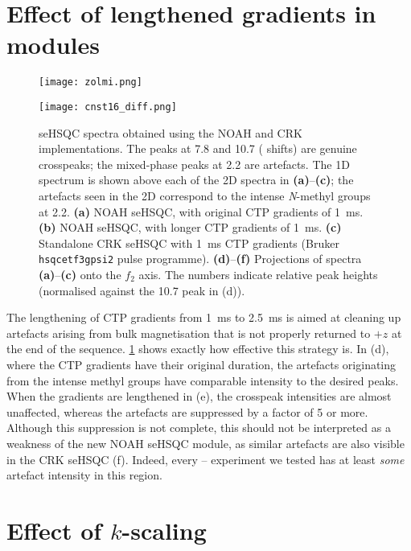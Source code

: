 \section{Effect of lengthened gradients in \texorpdfstring{\nitrogen{}}{15N} modules}

\begin{figure}
    \centering
    \texttt{[image: zolmi.png]}\phantom{aaaaaa}

    \texttt{[image: cnst16\_diff.png]}
    \caption{
        \nitrogen{} seHSQC spectra obtained using the NOAH and CRK implementations.
        The peaks at 7.8 and \SI{10.7}{\ppm} (\proton{} shifts) are genuine crosspeaks; the mixed-phase peaks at \SI{2.2}{\ppm} are artefacts.
        The 1D \proton{} spectrum is shown above each of the 2D spectra in \textbf{(a)}--\textbf{(c)}; the artefacts seen in the 2D correspond to the intense \textit{N}-methyl groups at \SI{2.2}{\ppm}.
        \textbf{(a)} NOAH seHSQC, with original CTP gradients of \SI{1}{\ms}.
        \textbf{(b)} NOAH seHSQC, with longer CTP gradients of \SI{1}{\ms}.
        \textbf{(c)} Standalone CRK seHSQC with \SI{1}{\ms} CTP gradients (Bruker \texttt{hsqcetf3gpsi2} pulse programme).
        \textbf{(d)}--\textbf{(f)} Projections of spectra \textbf{(a)}--\textbf{(c)} onto the $f_2$ axis.
        The numbers indicate relative peak heights (normalised against the \SI{10.7}{\ppm} peak in (d)).
        \zolmi{}
    }
    \label{fig:cnst16_diff}
\end{figure}

The lengthening of CTP gradients from \SI{1}{\ms} to \SI{2.5}{\ms} is aimed at cleaning up artefacts arising from bulk magnetisation that is not properly returned to $+z$ at the end of the sequence.
\cref{fig:cnst16_diff} shows exactly how effective this strategy is.
In (d), where the CTP gradients have their original duration, the artefacts originating from the intense methyl groups have comparable intensity to the desired peaks.
When the gradients are lengthened in (e), the crosspeak intensities are almost unaffected, whereas the artefacts are suppressed by a factor of 5 or more.
Although this suppression is not complete, this should not be interpreted as a weakness of the new NOAH seHSQC module, as similar artefacts are also visible in the CRK seHSQC (f).
Indeed, every \nitrogen{}--\proton{} experiment we tested has at least \textit{some} artefact intensity in this region.

\section{Effect of \texorpdfstring{$k$}{k}-scaling}

